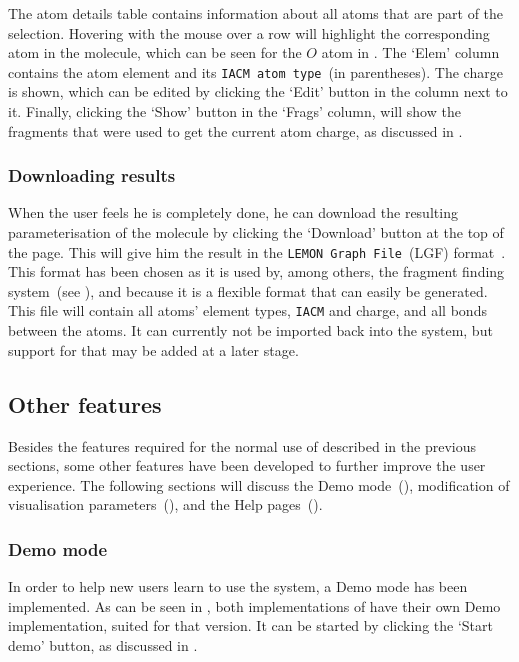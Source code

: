 The atom details table contains information about all atoms that are part of the selection. Hovering with the mouse over a row will highlight the corresponding atom in the molecule, which can be seen for the $O$ atom in . The `Elem' column contains the atom element and its \verb|IACM atom type|~(in parentheses). The charge is shown, which can be edited by clicking the `Edit' button in the column next to it. Finally, clicking the `Show' button in the `Frags' column, will show the fragments that were used to get the current atom charge, as discussed in \secref{}.


\subsubsection{Downloading results}
When the user feels he is completely done, he can download the resulting parameterisation of the molecule by clicking the `Download' button at the top of the page. This will give him the result in the \verb|LEMON Graph File|~(LGF) format~\cite{dezso2011lemon}. This format has been chosen as it is used by, among others, the fragment finding system~(see ), and because it is a flexible format that can easily be generated. This file will contain all atoms' element types, \verb|IACM| and charge, and all bonds between the atoms. It can currently not be imported back into the system, but support for that may be added at a later stage.


\subsection{Other features}
Besides the features required for the normal use of \oframp{} described in the previous sections, some other features have been developed to further improve the user experience. The following sections will discuss the Demo mode~(), modification of visualisation parameters~(), and the \oframp{} Help pages~().

\subsubsection{Demo mode}

In order to help new users learn to use the system, a Demo mode has been implemented. As can be seen in , both implementations of \oframp{} have their own Demo implementation, suited for that version. It can be started by clicking the `Start demo' button, as discussed in .

